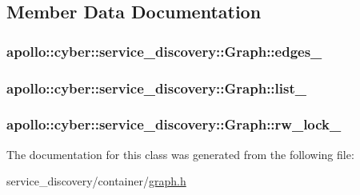 \subsection{Member Data Documentation}
\hypertarget{classapollo_1_1cyber_1_1service__discovery_1_1Graph_a74968952c03f0c041066d7018e9a5d3d}{
\subsubsection[{edges\-\_\-}]{ apollo\-::cyber\-::service\-\_\-discovery\-::\-Graph\-::edges\-\_\-\hspace{0.3cm}{\ttfamily [private]}}}\label{classapollo_1_1cyber_1_1service__discovery_1_1Graph_a74968952c03f0c041066d7018e9a5d3d}
\hypertarget{classapollo_1_1cyber_1_1service__discovery_1_1Graph_ae41f952e2dd84c01534f193ac3a089fa}{
\subsubsection[{list\-\_\-}]{ apollo\-::cyber\-::service\-\_\-discovery\-::\-Graph\-::list\-\_\-\hspace{0.3cm}{\ttfamily [private]}}}\label{classapollo_1_1cyber_1_1service__discovery_1_1Graph_ae41f952e2dd84c01534f193ac3a089fa}
\hypertarget{classapollo_1_1cyber_1_1service__discovery_1_1Graph_a7b06cdf8ac753e9e571b7e5789ad7bc1}{
\subsubsection[{rw\-\_\-lock\-\_\-}]{ apollo\-::cyber\-::service\-\_\-discovery\-::\-Graph\-::rw\-\_\-lock\-\_\-\hspace{0.3cm}{\ttfamily [private]}}}\label{classapollo_1_1cyber_1_1service__discovery_1_1Graph_a7b06cdf8ac753e9e571b7e5789ad7bc1}


The documentation for this class was generated from the following file\-:\begin{DoxyCompactItemize}
\item 
service\-\_\-discovery/container/\hyperlink{graph_8h}{graph.\-h}\end{DoxyCompactItemize}
